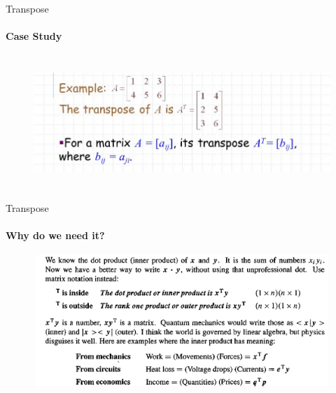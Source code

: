 \documentclass[aspectratio=169,notes]{beamer}
\begin{document}
\begin{frame}[t]{Transpose}
\framesubtitle{Case Study}
\begin{figure}[H]
    \centering\includegraphics[height=5cm,width=1\textwidth,keepaspectratio]{transpose_case.png}
    \label{fig:transpose_case.png}
\end{figure} 
\end{frame}

\begin{frame}[t]{Transpose}
\framesubtitle{Why do we need it?}
    \begin{figure}[H]
        \centering\includegraphics[height=5cm,width=1\textwidth,keepaspectratio]{transpose.png}
        \label{fig:transpose.png}
    \end{figure}
\end{frame}
\end{document}
